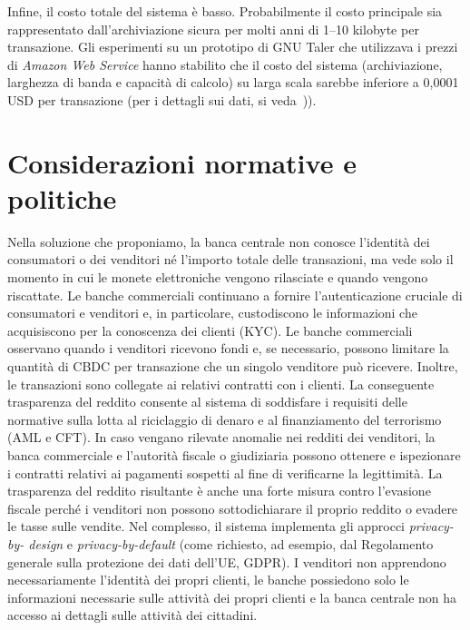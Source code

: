 \documentclass{article}
\begin{document}
Infine, il costo totale del sistema è basso. Probabilmente il costo
principale sia rappresentato dall'archiviazione sicura per 
molti anni di 1–10 kilobyte per transazione. Gli esperimenti su un 
prototipo di GNU Taler che utilizzava i prezzi di \textit{Amazon Web Service} 
hanno stabilito che il costo del sistema (archiviazione, larghezza di 
banda e capacità di calcolo) su larga scala sarebbe inferiore a 
0,0001 USD per transazione (per i dettagli sui dati, si veda~\cite{Dold})).

\section{Considerazioni normative e politiche}
    \label{5.-considerazioni-normative-e-politiche}

Nella soluzione che proponiamo, la banca centrale non conosce  
l'identità dei consumatori o dei venditori né l'importo totale delle 
transazioni, ma vede solo il momento in cui le monete elettroniche vengono 
rilasciate e quando vengono riscattate. Le banche commerciali continuano a 
fornire l'autenticazione cruciale di consumatori e venditori e, in particolare, 
custodiscono le informazioni che acquisiscono per la conoscenza dei clienti 
(KYC). Le banche commerciali osservano quando i venditori ricevono fondi e, se 
necessario, possono limitare la quantità di CBDC per transazione che 
un singolo venditore può ricevere. Inoltre, le transazioni sono 
collegate ai relativi contratti con i clienti. La conseguente 
trasparenza del reddito  consente al sistema di soddisfare i requisiti 
delle normative sulla lotta al riciclaggio di denaro e al 
finanziamento del terrorismo (AML e CFT). In caso vengano rilevate 
anomalie nei redditi dei venditori, la banca commerciale e 
l'autorità fiscale o giudiziaria possono ottenere e ispezionare i 
contratti relativi ai pagamenti sospetti al fine di verificarne la 
legittimità. La trasparenza del reddito risultante è anche una forte 
misura contro l'evasione fiscale perché i venditori non possono 
sottodichiarare il proprio reddito o evadere le tasse sulle vendite. 
Nel complesso, il sistema implementa gli approcci \textit{privacy-by-
design} e \textit{privacy-by-default} (come richiesto, ad esempio, 
dal Regolamento generale sulla protezione dei dati dell'UE, GDPR). I 
venditori non apprendono necessariamente l'identità dei propri clienti, 
le banche possiedono solo le informazioni necessarie sulle attività dei 
propri clienti e la banca centrale non ha accesso ai dettagli sulle 
attività dei cittadini.
\end{document}
